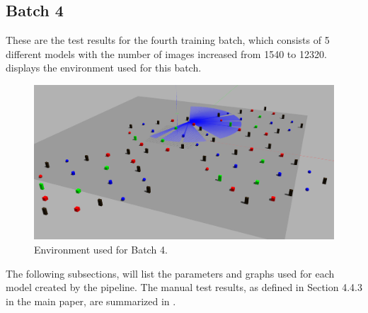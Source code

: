 \newpage

\subsection{Batch 4 \label{batch_4} }
These are the test results for the fourth training batch, which consists of 5 different models with the number of images increased from 1540 to 12320.  displays the environment used for this batch.

\begin{figure}[H]%
\centering
\includegraphics[width=1\textwidth]{Bilder/env5.png} 
\caption[]{Environment used for Batch 4.}
\label{env5}
\end{figure}

The following subsections, will list the parameters and graphs used for each model created by the pipeline. The manual test results, as defined in Section 4.4.3 in the main paper, are summarized in .


\newpage

